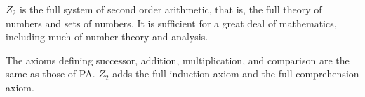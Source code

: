 \documentclass[12pt]{article}
\begin{document}
$Z_2$ is the full system of second order arithmetic, that is, the full theory of numbers and sets of numbers.  It is sufficient for a great deal of mathematics, including much of number theory and analysis.

The axioms defining successor, addition, multiplication, and comparison are the same as those of PA.  $Z_2$ adds the full induction axiom and the full comprehension axiom.
\end{document}
